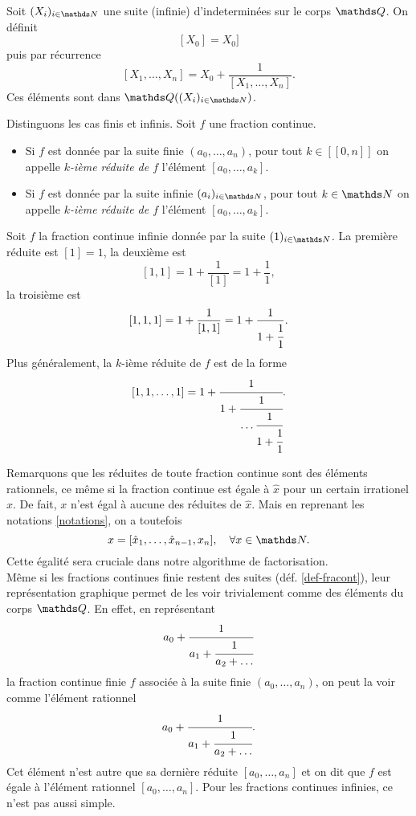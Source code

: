 \begin{definition}
	Soit $(X_i)_{i\in \N}$ une suite (infinie) d'indeterminées sur le corps
	$\Q$. On définit \[[X_0] = X_0]\] puis par récurrence \[[X_1, \dots,
	X_n] = X_0 + \frac{1}{[X_1, \dots, X_n]}.\] Ces éléments sont dans
	$\Q((X_i)_{i\in \N})$.
\end{definition}

\begin{definition}
	Distinguons les cas finis et infinis. Soit $f$ une fraction
	continue.
	\begin{itemize}
		\item Si $f$ est donnée par la suite finie $(a_0, \dots, a_n)$, pour
		tout $k\in [\![0, n]\!]$ on appelle \emph{$k$-ième réduite de $f$}
		l'élément $[a_0, \dots, a_k]$.
		\item Si $f$ est donnée par la suite infinie $(a_i)_{i\in \N}$, pour
		tout $k\in \N$ on appelle \emph{$k$-ième réduite de $f$} l'élément
		$[a_0, \dots, a_k]$.
	\end{itemize}
\end{definition}

\begin{exemple}
	Soit $f$ la fraction continue infinie donnée par la suite $(1)_{i\in \N}$.
	La première réduite est $[1] = 1$, la deuxième est \[[1, 1] = 1 +
	\frac{1}{[1]} = 1 + \frac{1}{1},\] la troisième est \[[1, 1, 1] = 1 +
	\frac{1}{[1, 1]} = 1 + \frac{1}{1 + \cfrac{1}{1}}.\] Plus généralement, la
	$k$-ième réduite de $f$ est de la forme \[[1, 1, \dots, 1] = 1 +
	\cfrac{1}{1 + \cfrac{1}{\dots \\ \cfrac{1}{1 +
	\cfrac{1}{1}}}}.\]
\end{exemple}

Remarquons que les réduites de toute fraction continue sont des éléments
rationnels, ce même si la fraction continue est égale à $\hat{x}$ pour un
certain irrationel $x$. De fait, $x$ n'est égal à aucune des réduites de
$\hat{x}$. Mais en reprenant les notations \ref{notations}, on a toutefois
\begin{equation}
	x = [\hat{x}_1, \dots, \hat{x}_{n-1}, x_n], \quad \forall x\in \N.
\end{equation}
Cette égalité sera cruciale dans notre algorithme de factorisation. \\

Même si les fractions continues finie restent des suites (déf.
\ref{def-fracont}), leur représentation graphique permet de les voir
trivialement comme des éléments du corps $\Q$. En effet, en représentant \[a_0
+ \cfrac{1}{a_1 + \cfrac{1}{a_2 + \dots}}\] la fraction continue finie $f$
associée à la suite finie $(a_0, \dots, a_n)$, on peut la voir comme l'élément
rationnel \[a_0 + \cfrac{1}{a_1 + \cfrac{1}{a_2 + \dots}}.\] Cet élément n'est
autre que sa dernière réduite $[a_0, \dots, a_n]$ et on dit que $f$ est égale à
l'élément rationnel $[a_0, \dots, a_n]$. Pour les fractions continues infinies,
ce n'est pas aussi simple.

